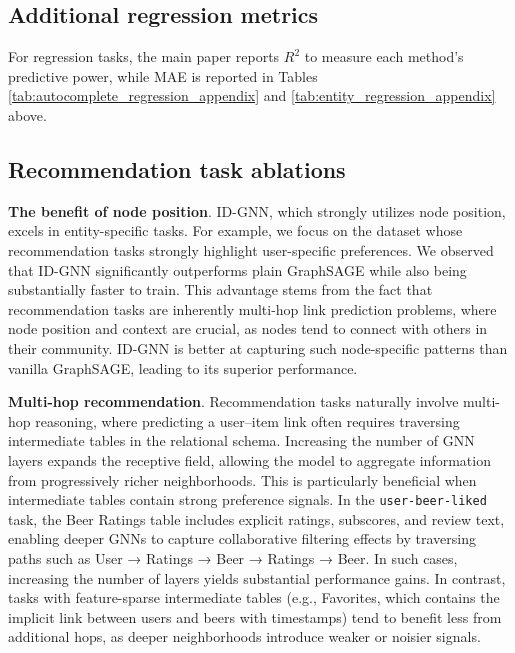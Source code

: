 \begin{table}[!ht]
  \centering
  \caption{{\bf Recommendation results on \relbench.} Recommendation uses the MAP metric (higher is better). Best values are in bold.}
  \label{tab:recommendation_appendix}
  \renewcommand{\arraystretch}{1.1}
  \scriptsize
    \resizebox{\textwidth}{!}{
    
    }
  \vspace{10pt}
\end{table}


\subsection{Additional regression metrics}

For regression tasks, the main paper reports $R^2$ to measure each method's predictive power, while MAE is reported in Tables \ref{tab:autocomplete_regression_appendix} and \ref{tab:entity_regression_appendix} above.

\newpage

\subsection{Recommendation task ablations}

\textbf{The benefit of node position}. ID-GNN, which strongly utilizes node position, excels in entity-specific tasks. For example, we focus on the \ratebeer dataset whose recommendation tasks strongly highlight user-specific preferences. We observed that ID-GNN significantly outperforms plain GraphSAGE while also being substantially faster to train. This advantage stems from the fact that recommendation tasks are inherently multi-hop link prediction problems, where node position and context are crucial, as nodes tend to connect with others in their community. ID-GNN is better at capturing such node-specific patterns than vanilla GraphSAGE, leading to its superior performance.

\textbf{Multi-hop recommendation}. Recommendation tasks naturally involve multi-hop reasoning, where predicting a user–item link often requires traversing intermediate tables in the relational schema. Increasing the number of GNN layers expands the receptive field, allowing the model to aggregate information from progressively richer neighborhoods. This is particularly beneficial when intermediate tables contain strong preference signals. In the \texttt{user-beer-liked} task, the Beer Ratings table includes explicit ratings, subscores, and review text, enabling deeper GNNs to capture collaborative filtering effects by traversing paths such as User → Ratings → Beer → Ratings → Beer. In such cases, increasing the number of layers yields substantial performance gains. In contrast, tasks with feature-sparse intermediate tables (e.g., Favorites, which contains the implicit link between users and beers with timestamps) tend to benefit less from additional hops, as deeper neighborhoods introduce weaker or noisier signals.

